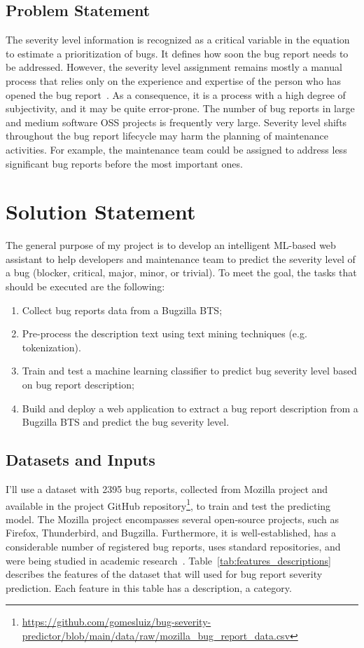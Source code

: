 \documentclass[a4paper]{article}
\begin{document}
\subsection{Problem Statement}
The severity level information is recognized as a critical variable in the equation to estimate a prioritization of bugs. It defines how soon the bug report needs to be addressed. However, the severity level assignment remains mostly a manual process that relies only on the experience and expertise of the person who has opened the bug report~\cite{Yang:2017}. As a consequence, it is a process with a high degree of subjectivity, and it may be quite error-prone. The number of bug reports in large and medium software OSS projects is frequently very large. Severity level shifts throughout the bug report lifecycle may harm the planning of maintenance activities. For example, the maintenance team could be assigned to address less significant bug reports before the most important ones.

\bigskip

\section{Solution Statement}
The general purpose of my project is to develop an intelligent ML-based web assistant to help developers and maintenance team to predict the severity level of a bug (blocker, critical, major, minor, or trivial). To meet the goal, the tasks that should be executed are the following:
\begin{enumerate}
    \item Collect bug reports data from a Bugzilla BTS;
    \item Pre-process the description text using text mining techniques (e.g. tokenization).
    \item Train and test a machine learning classifier to predict bug severity level based on bug report description;
    \item Build and deploy a web application to extract a bug report description from a Bugzilla BTS and predict the bug severity level.
\end{enumerate}
\subsection{Datasets and Inputs}
I'll use a dataset with 2395 bug reports, collected from Mozilla project and available in the project GitHub repository\footnote{\url{https://github.com/gomesluiz/bug-severity-predictor/blob/main/data/raw/mozilla_bug_report_data.csv}}, to train and test the predicting model. The Mozilla project encompasses several open-source projects, such as Firefox, Thunderbird, and Bugzilla. Furthermore, it is well-established, has a considerable number of registered bug reports, uses standard repositories, and were being studied in academic research~\cite{Lamkanfi:2010, Lamkanfi:2011, Tian:2012}. Table~\ref{tab:features_descriptions} describes the features of the dataset that will used for bug report severity prediction. Each feature in this table has a description, a category.
\end{document}
